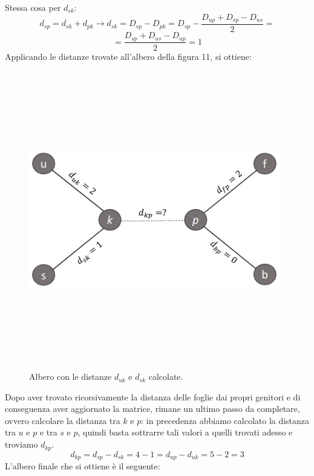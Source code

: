 Stessa cosa per $d_{sk}$:
\[d_{sp}=d_{sk}+d_{pk} \rightarrow d_{sk}=D_{sp}-D_{pk}=D_{sp}-\frac{D_{up}+D_{sp}-D_{us}}2=\]
\[=\frac{D_{sp}+D_{us}-D_{up}}2=1\]
Applicando le distanze trovate all'albero della figura 11, si ottiene:
\newpage
\begin{figure}[h!]
\centering
	\includegraphics[height=13cm, width=11cm, keepaspectratio]{distance_between_s_u_part_2.jpg}
 	\caption{Albero con le distanze $d_{uk}$ e $d_{sk}$ calcolate.}
  	\label{fig:neighborsleaves_3}
\end{figure}
Dopo aver trovato ricorsivamente la distanza delle foglie dai propri genitori e di conseguenza aver aggiornato la matrice, rimane un ultimo passo da completare, ovvero calcolare la distanza tra $k$ e $p$: in precedenza abbiamo calcolato la distanza tra $u$ e $p$ e tra $s$ e $p$, quindi basta sottrarre tali valori a quelli trovati adesso e troviamo $d_{kp}$.
\[d_{kp}=d_{sp}-d_{sk}=4-1=d_{up}-d_{uk}=5-2=3\]
L'albero finale che si ottiene è il seguente:
